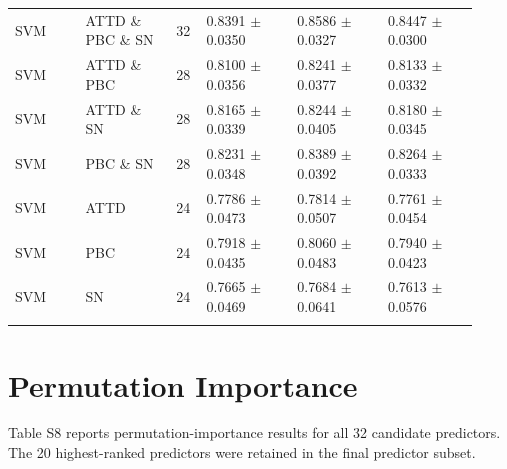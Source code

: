 \documentclass[10pt,a4paper]{article}
\renewcommand{\arraystretch}{1.10}
\newcommand{\classifiersep}{\addlinespace[1pt]\midrule\addlinespace[1pt]}
\begin{document}
\begin{landscape}
\begin{longtable}{@{}L{0.14\linewidth}L{0.18\linewidth}C{0.06\linewidth}C{0.18\linewidth}C{0.18\linewidth}C{0.18\linewidth}@{}}
\classifiersep
SVM & ATTD \& PBC \& SN & 32 & 0.8391 $\pm$ 0.0350 & 0.8586 $\pm$ 0.0327 & 0.8447 $\pm$ 0.0300 \\
SVM & ATTD \& PBC & 28 & 0.8100 $\pm$ 0.0356 & 0.8241 $\pm$ 0.0377 & 0.8133 $\pm$ 0.0332 \\
SVM & ATTD \& SN & 28 & 0.8165 $\pm$ 0.0339 & 0.8244 $\pm$ 0.0405 & 0.8180 $\pm$ 0.0345 \\
SVM & PBC \& SN & 28 & 0.8231 $\pm$ 0.0348 & 0.8389 $\pm$ 0.0392 & 0.8264 $\pm$ 0.0333 \\
SVM & ATTD & 24 & 0.7786 $\pm$ 0.0473 & 0.7814 $\pm$ 0.0507 & 0.7761 $\pm$ 0.0454 \\
SVM & PBC & 24 & 0.7918 $\pm$ 0.0435 & 0.8060 $\pm$ 0.0483 & 0.7940 $\pm$ 0.0423 \\
SVM & SN & 24 & 0.7665 $\pm$ 0.0469 & 0.7684 $\pm$ 0.0641 & 0.7613 $\pm$ 0.0576 \\
\classifiersep
\end{longtable}
\end{landscape}
\normalsize
\renewcommand{\arraystretch}{1.10}

\section*{Permutation Importance}

\noindent
Table S8 reports permutation-importance results for all 32 candidate predictors. The 20 highest-ranked predictors were retained in the final predictor subset.
\end{document}
